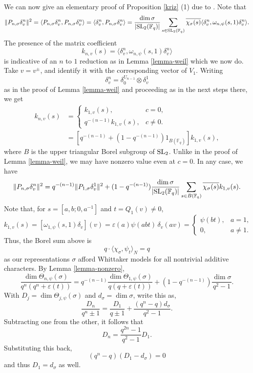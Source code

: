 \documentclass[12pt]{amsart}
\theoremstyle{definition}
\theoremstyle{remark}
\begin{document}
We can now give an elementary proof of Proposition \ref{kriz} (1) due to \cite{lost10,kri25}. Note that
\[\|P_{n,\sigma}\delta^n_v\|^2 = \langle P_{n,\sigma}\delta^n_v, P_{n,\sigma}\delta^n_v \rangle = \langle \delta^n_v, P_{n,\sigma}\delta^n_v \rangle = \frac{\dim\sigma}{|{\rm SL}_2(\mathbb F_q)|}
\sum_{s\in {\rm SL}_2(\mathbb F_q)}
\overline{\chi_\sigma(s)} \langle \delta^n_v, \omega_{n,\psi}(s,1)\delta^n_v \rangle. \]
The presence of the matrix coefficient
\[k_{n,v}(s) =  \langle \delta^n_v, \omega_{n,\psi}(s,1)\delta^n_v \rangle\]
is indicative of an $n$ to $1$ reduction as in Lemma \ref{lemma-weil} which we now do. 
Take $v=v^\pm$, and identify it with the corresponding vector of $V_1$.
Writing 
\[\delta^n_v = \delta_0^{U_{n-1}} \otimes \delta^1_v\]
as in the proof of Lemma \ref{lemma-weil} and proceeding as in the next steps there, we get
\begin{align*}
k_{n,v}(s) &=
\begin{cases}
k_{1,v}(s),& c=0,\\
q^{-(n-1)}k_{1,v}(s),&c \neq 0.
\end{cases} \\
&= [q^{-(n-1)}+(1-q^{-(n-1)})1_{B(\mathbb F_q)}] k_{1,v}(s),
\end{align*}
where $B$ is the upper triangular Borel subgroup of ${\rm SL}_2$.
Unlike in the proof of Lemma \ref{lemma-weil}, we may have nonzero value even at $c=0$. In any case, we have
\[\|P_{n,\sigma}\delta^n_v\|^2 = q^{-(n-1)} \|P_{1,\sigma}\delta^1_v\|^2 + (1-q^{-(n-1)})  \frac{\dim\sigma}{|{\rm SL}_2(\mathbb F_q)|}
\sum_{s\in B(\mathbb F_q)}
\overline{\chi_\sigma(s)} k_{1,v}(s). \]
Note that, for $s=[a,b;0,a^{-1}]$ and $t=Q_1(v) \neq 0$,
\[
k_{1,v}(s)
=[\omega_{1,\psi}(s,1)\delta_v](v)
=\varepsilon(a)\psi(abt)\,\delta_v(av) =
\begin{cases}
\psi(bt),&a=1,\\
0,&a \neq 1.
\end{cases}
\]
Thus, the Borel sum above is 
\[q \cdot \langle \chi_\sigma, \psi_t \rangle_N = q\] as our representations $\sigma$ afford Whittaker models for all nontrivial additive characters.
By Lemma \ref{lemma-nonzero}, 
\[
 \frac{\dim\Theta_{n,\psi}(\sigma)} {q^n(q^n+\varepsilon(t))}
 = q^{-(n-1)}  \frac{\dim\Theta_{1,\psi}(\sigma)}
     {q(q+\varepsilon(t))} + (1-q^{-(n-1)}) \frac{\dim \sigma}{q^2-1}.
\]
With $D_j=\dim\Theta_{j,\psi}(\sigma)$ and $d_\sigma=\dim\sigma$, write this as,
\[\frac{D_n}{q^n \pm 1} = \frac{D_1}{q \pm 1} + \frac{(q^n-q)d_\sigma}{q^2-1}.\]
Subtracting one from the other, it follows that 
\[D_n = \frac{q^{2n}-1}{q^2-1}D_1.\] Substituting this back,
\[(q^n-q)(D_1-d_\sigma)=0\] and thus $D_1=d_\sigma$ as well.
\end{document}
